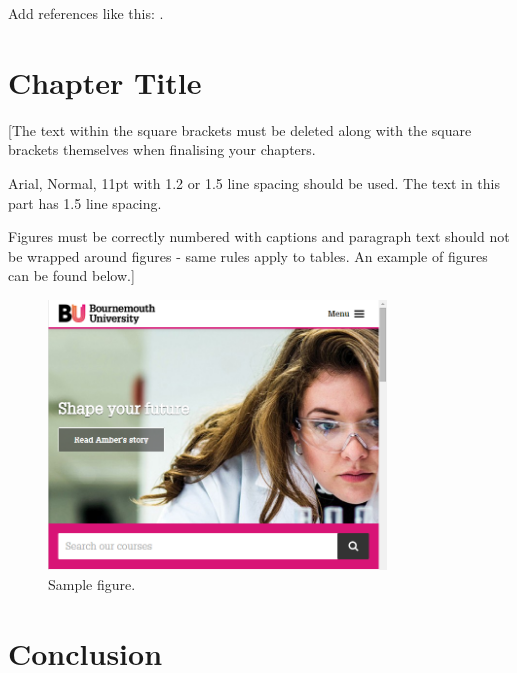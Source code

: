 Add references like this: \cite{UbuntuSecurity}.



\chapter{Chapter Title}
\thispagestyle{fancy} %


[The text within the square brackets must be deleted along with the square brackets themselves when finalising your chapters. 

Arial, Normal, 11pt with 1.2 or 1.5 line spacing should be used. The text in this part has 1.5 line spacing.

Figures must be correctly numbered with captions and paragraph text should not be wrapped around figures - same rules apply to tables. An example of figures can be found below.]

\begin{figure}[h]
	\centering	
	\includegraphics[width=0.8\textwidth]{images/figtest.png}
	\caption{Sample figure.}
	\label{fig:test2}	
\end{figure}






\chapter{Conclusion}
\thispagestyle{fancy} %


